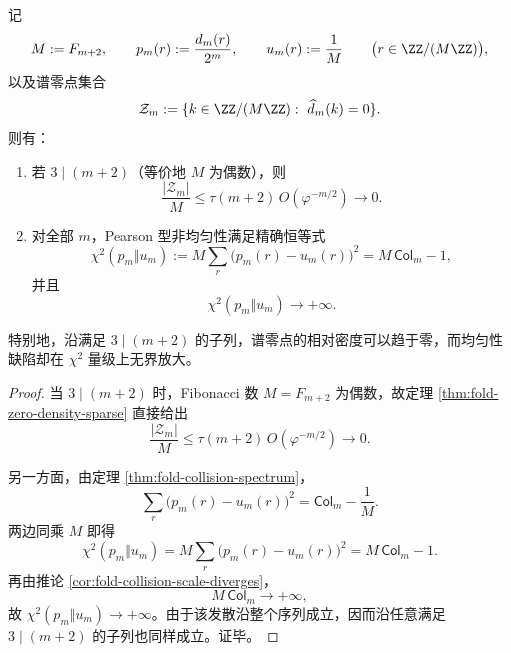 \begin{theorem}\label{thm:conclusion-zero-density-pearson-explosion-strict-separation}
记
\[
M:=F_{m+2},
\qquad
p_m(r):=\frac{d_m(r)}{2^m},
\qquad
u_m(r):=\frac{1}{M}
\qquad \bigl(r\in \ZZ/(M\ZZ)\bigr),
\]
以及谱零点集合
\[
\mathcal Z_m:=\{k\in \ZZ/(M\ZZ):\ \widehat d_m(k)=0\}.
\]
则有：
\begin{enumerate}
  \item 若 \(3\mid(m+2)\)（等价地 \(M\) 为偶数），则
  \[
  \frac{|\mathcal Z_m|}{M}
  \le
  \tau(m+2)\,O(\varphi^{-m/2})
  \longrightarrow 0.
  \]
  \item 对全部 \(m\)，Pearson 型非均匀性满足精确恒等式
  \[
  \chi^2(p_m\Vert u_m)
  :=
  M\sum_r\bigl(p_m(r)-u_m(r)\bigr)^2
  =
  M\,\mathsf{Col}_m-1,
  \]
  并且
  \[
  \chi^2(p_m\Vert u_m)\longrightarrow +\infty.
  \]
\end{enumerate}
特别地，沿满足 \(3\mid(m+2)\) 的子列，谱零点的相对密度可以趋于零，而均匀性缺陷却在 \(\chi^2\) 量级上无界放大。
\end{theorem}
\begin{proof}
当 \(3\mid(m+2)\) 时，Fibonacci 数 \(M=F_{m+2}\) 为偶数，故定理 \ref{thm:fold-zero-density-sparse} 直接给出
\[
\frac{|\mathcal Z_m|}{M}
\le
\tau(m+2)\,O(\varphi^{-m/2})
\longrightarrow 0.
\]

另一方面，由定理 \ref{thm:fold-collision-spectrum}，
\[
\sum_r\bigl(p_m(r)-u_m(r)\bigr)^2
=
\mathsf{Col}_m-\frac{1}{M}.
\]
两边同乘 \(M\) 即得
\[
\chi^2(p_m\Vert u_m)
=
M\sum_r\bigl(p_m(r)-u_m(r)\bigr)^2
=
M\,\mathsf{Col}_m-1.
\]
再由推论 \ref{cor:fold-collision-scale-diverges}，
\[
M\,\mathsf{Col}_m\longrightarrow +\infty,
\]
故 \(\chi^2(p_m\Vert u_m)\to+\infty\)。由于该发散沿整个序列成立，因而沿任意满足 \(3\mid(m+2)\) 的子列也同样成立。证毕。
\end{proof}

